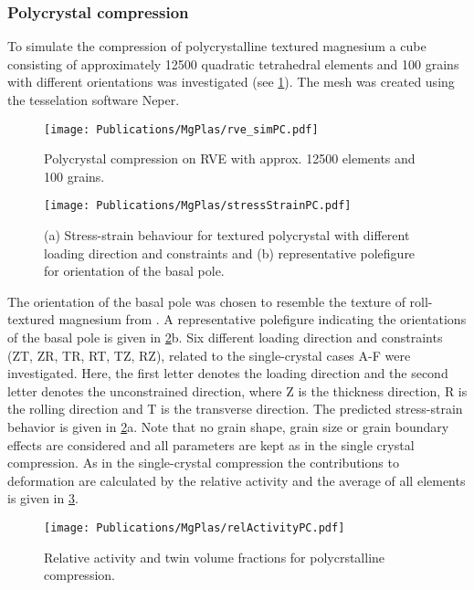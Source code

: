   \subsubsection{Polycrystal compression} \label{sec:PCcompression} %
  To simulate the compression of polycrystalline textured magnesium a cube consisting of approximately 12500 quadratic tetrahedral elements and 100 grains with different orientations was investigated (see \cref{fig:cubeCompression}). The mesh was created using the tesselation software Neper\supercite{quey2011neper,quey2022neper}.
  
  \begin{figure}[!ht]
    \texttt{[image: Publications/MgPlas/rve\_simPC.pdf]}
    \caption{Polycrystal compression on RVE with approx. 12500 elements and 100 grains.}
    \label{fig:cubeCompression}
  \end{figure}
  
  \begin{figure}[!ht]
    \centering
    \texttt{[image: Publications/MgPlas/stressStrainPC.pdf]}
    \caption{(a) Stress-strain behaviour for textured polycrystal with different loading direction and constraints and (b) representative polefigure for orientation of the basal pole.}
    \label{fig:stressStrainPC}
  \end{figure}
  
  The orientation of the basal pole was chosen to resemble the texture of roll-textured magnesium from . A representative polefigure indicating the orientations of the basal pole is given in \cref{fig:stressStrainPC}b. Six different loading direction and constraints (ZT, ZR, TR, RT, TZ, RZ), related to the single-crystal cases A-F were investigated. Here, the first letter denotes the loading direction and the second letter denotes the unconstrained direction, where Z is the thickness direction, R is the rolling direction and T is the transverse direction. The predicted stress-strain behavior is given in \cref{fig:stressStrainPC}a. Note that no grain shape, grain size or grain boundary effects are considered and all parameters are kept as in the single crystal compression. As in the single-crystal compression the contributions to deformation are calculated by the relative activity and the average of all elements is given in \cref{fig:relActPC}.
  
  \begin{figure}[!ht]
    \centering
    \texttt{[image: Publications/MgPlas/relActivityPC.pdf]}
    \caption{Relative activity and twin volume fractions for polycrstalline compression.}
    \label{fig:relActPC}
  \end{figure}
  
